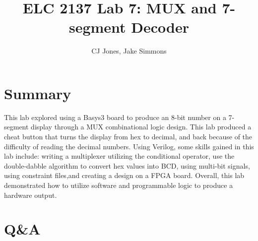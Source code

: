 \documentclass[11pt]{article}
\begin{document}
\title{ELC 2137 Lab 7: MUX and 7-segment Decoder}
\author{CJ Jones, Jake Simmons}

\maketitle


\section*{Summary}

This lab explored using a Basys3 board to produce an 8-bit number on a 7-segment display through a MUX combinational logic design. This lab produced a cheat button that turns the display from hex to decimal, and back because of the difficulty of reading the decimal numbers. Using Verilog, some skills gained in this lab include: writing a multiplexer utilizing the conditional operator, use the double-dabble algorithm to convert hex values into BCD, using multi-bit signals, using constraint files,and creating a design on a FPGA board. Overall, this lab demonstrated how to utilize software and programmable logic to produce a hardware output.




\section*{Q\&A}
\end{document}
